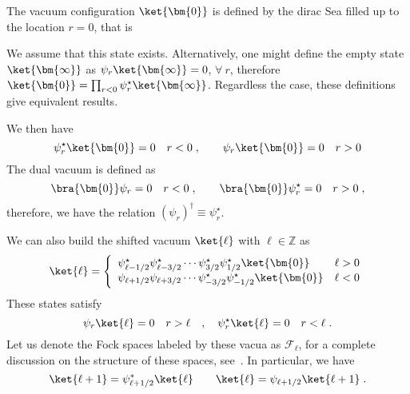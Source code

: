 The vacuum configuration \(\ket{\bm{0}}\) is defined by the dirac Sea
filled up to the location \(r=0\), that is
\begin{center}
\end{center}	
We assume that this state exists. Alternatively, one might define the empty state
\(\ket{\bm{\infty}}\) as \(\psi_r\ket{\bm{\infty}} = 0 \), \(\forall \ r \), therefore
\(\ket{\bm{0}} = \prod_{r < 0} \psi^\star_r \ket{\bm{\infty}}\). Regardless the case,
these definitions give equivalent results. 

We then have
\begin{equation}
\psi_{r}^\star\ket{\bm{0}}=0\ \ \ r< 0\; , \qquad  
\psi_{r} \ket{\bm{0}} = 0 \ \ \ r> 0
\end{equation}
The dual vacuum is defined as
\begin{equation}
\bra{\bm{0}} \psi_{r}=0\ \ \ r< 0\; , \qquad  
\bra{\bm{0}} \psi_{r}^\star = 0 \ \ \ r> 0\; ,
\end{equation}
therefore, we have the relation \((\psi_r)^\dagger\equiv \psi_r^\star\).

We can also build the shifted vacuum \(\ket{\ell}\) with \(\ell \in
\mathbb{Z}\) as
\begin{equation}
  \label{eq:charged-states}
  \ket{\ell} = 
  \left\{
  \begin{array}{ll}
    \psi^\star_{\ell - 1/2} \psi^\star_{\ell - 3/2} \cdots \psi^\star_{3/2} \psi^\star_{1/2} \ket{\bm{0}} & \ell > 0 \\
    \psi_{\ell + 1/2} \psi_{\ell + 3/2} \cdots \psi^\star_{-3/2} \psi^\star_{-1/2} \ket{\bm{0}} & \ell < 0
  \end{array}
  \right.
\end{equation}
These states satisfy
\begin{equation}
\psi_r\ket{\ell} = 0 \quad r > \ell \quad , \quad  
\psi_r^\star\ket{\ell} = 0  \quad r < \ell \; .
\end{equation}
Let us denote the Fock spaces labeled by these vacua as
\(\mathcal{F}_\ell\), for a complete discussion on the
structure of these spaces, see~\cite{Wheeler:2010vmq}. 
In particular, we have
\begin{equation}
\ket{\ell + 1} = \psi^\ast_{\ell + 1/2} \ket{\ell} \qquad
\ket{\ell} = \psi_{\ell + 1/2} \ket{\ell + 1} \; .
\end{equation}

